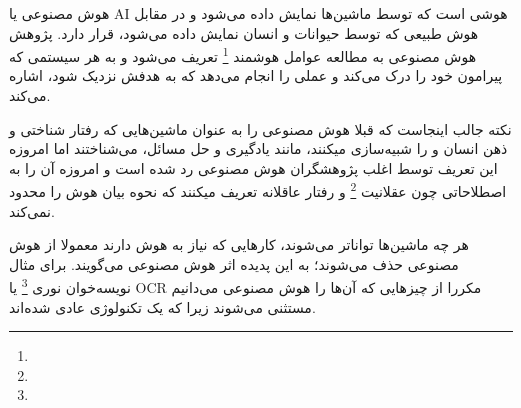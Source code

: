 \documentclass[a4paper, 12pt]{article}
\begin{document}
 هوش مصنوعی یا AI هوشی است که توسط ماشین‌ها نمایش داده می‌شود و در مقابل هوش طبیعی که توسط حیوانات و انسان نمایش داده می‌شود، قرار دارد. پژوهش هوش مصنوعی به مطالعه عوامل هوشمند 
 \footnote{}
  تعریف می‌شود و به هر سیستمی که پیرامون خود را درک می‌کند و عملی را انجام می‌دهد که به هدفش نزدیک شود، اشاره می‌کند. 
 
 نکته جالب اینجاست که قبلا هوش مصنوعی را به عنوان ماشین‌هایی که رفتار شناختی و ذهن انسان و را شبیه‌سازی میکنند، مانند یادگیری و حل مسائل، می‌شناختند اما امروزه این تعریف توسط اغلب پژوهشگران هوش مصنوعی رد شده است و امروزه آن را به اصطلاحاتی چون عقلانیت
 \footnote{}
 و رفتار عاقلانه تعریف میکنند که نحوه بیان هوش را محدود نمی‌کند.
 
  هر چه ماشین‌ها تواناتر می‌شوند، کارهایی که نیاز به هوش دارند معمولا از هوش مصنوعی حذف می‌شوند؛ به این پدیده اثر هوش مصنوعی می‌گویند. برای مثال نویسه‌خوان نوری
  \footnote{}
   یا OCR مکررا از چیز‌هایی که آن‌ها را هوش مصنوعی می‌دانیم مستثنی می‌شوند زیرا که یک تکنولوژی عادی شده‌اند.  
   
\end{document}

